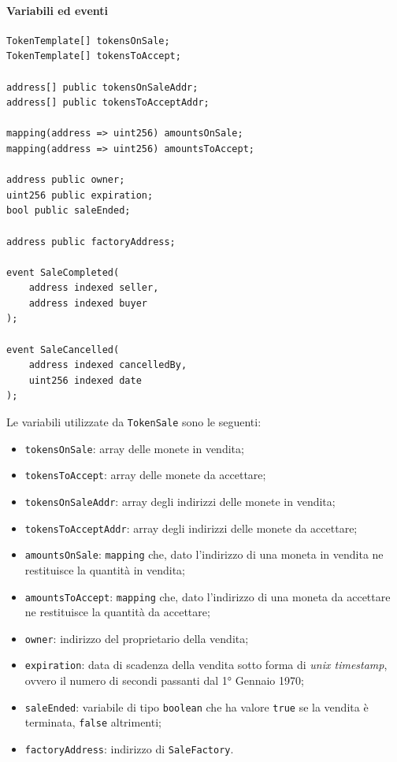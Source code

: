 \documentclass[a4paper]{article}
\begin{document}
        \paragraph{Variabili ed eventi}
\begin{lstlisting}[style=ES6, title={Variabili ed eventi di TokenSale}]
TokenTemplate[] tokensOnSale;
TokenTemplate[] tokensToAccept;

address[] public tokensOnSaleAddr;
address[] public tokensToAcceptAddr;

mapping(address => uint256) amountsOnSale;
mapping(address => uint256) amountsToAccept;

address public owner;
uint256 public expiration;
bool public saleEnded;

address public factoryAddress;

event SaleCompleted(
    address indexed seller,
    address indexed buyer
);

event SaleCancelled(
    address indexed cancelledBy,
    uint256 indexed date
);\end{lstlisting}
        Le variabili utilizzate da \verb|TokenSale| sono le seguenti:
        \begin{itemize}
          \item \verb|tokensOnSale|: array delle monete in vendita;
          \item \verb|tokensToAccept|: array delle monete da accettare;
          \item \verb|tokensOnSaleAddr|: array degli indirizzi delle monete in vendita;
          \item \verb|tokensToAcceptAddr|: array degli indirizzi delle monete da accettare;
          \item \verb|amountsOnSale|: \verb|mapping| che, dato l'indirizzo di una moneta in vendita ne restituisce la quantità in vendita;
          \item \verb|amountsToAccept|: \verb|mapping| che, dato l'indirizzo di una moneta da accettare ne restituisce la quantità da accettare;
          \item \verb|owner|: indirizzo del proprietario della vendita;
          \item \verb|expiration|: data di scadenza della vendita sotto forma di \emph{unix timestamp}, ovvero il numero di secondi passanti dal 1° Gennaio 1970;
          \item \verb|saleEnded|: variabile di tipo \verb|boolean| che ha valore \verb|true| se la vendita è terminata, \verb|false| altrimenti;
          \item \verb|factoryAddress|: indirizzo di \verb|SaleFactory|.
        \end{itemize}
\end{document}
